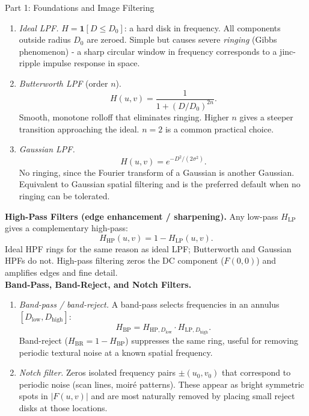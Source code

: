 \documentclass[letterpaper]{article}
\begin{document}
\begin{notes}{Part 1: Foundations and Image Filtering}
\begin{enumerate}
    \item \textit{Ideal LPF.} $H = \mathbf{1}[D \le D_0]$: a hard disk in frequency. All components outside radius $D_0$ are zeroed. Simple but causes severe \emph{ringing} (Gibbs phenomenon) - a sharp circular window in frequency corresponds to a jinc-ripple impulse response in space.

    \item \textit{Butterworth LPF} (order $n$).
    $$H(u,v) = \frac{1}{1+(D/D_0)^{2n}}.$$
    Smooth, monotone rolloff that eliminates ringing. Higher $n$ gives a steeper transition approaching the ideal. $n=2$ is a common practical choice.

    \item \textit{Gaussian LPF.}
    $$H(u,v) = e^{-D^2/(2\sigma^2)}.$$
    No ringing, since the Fourier transform of a Gaussian is another Gaussian. Equivalent to Gaussian spatial filtering and is the preferred default when no ringing can be tolerated.

 
\end{enumerate}

\textbf{High-Pass Filters (edge enhancement / sharpening).} Any low-pass $H_{\text{LP}}$ gives a complementary high-pass:
$$H_{\text{HP}}(u,v) = 1 - H_{\text{LP}}(u,v).$$
Ideal HPF rings for the same reason as ideal LPF; Butterworth and Gaussian HPFs do not. High-pass filtering zeros the DC component ($F(0,0)$) and amplifies edges and fine detail.\\

\textbf{Band-Pass, Band-Reject, and Notch Filters.}

\begin{enumerate}
    \item \textit{Band-pass / band-reject.} A band-pass selects frequencies in an annulus $[D_{\text{low}}, D_{\text{high}}]$:
    $$H_{\text{BP}} = H_{\text{HP},D_{\text{low}}} \cdot H_{\text{LP},D_{\text{high}}}.$$
    Band-reject ($H_{\text{BR}} = 1 - H_{\text{BP}}$) suppresses the same ring, useful for removing periodic textural noise at a known spatial frequency.
    
    \item \textit{Notch filter.} Zeros isolated frequency pairs $\pm(u_0, v_0)$ that correspond to periodic noise (scan lines, moiré patterns). These appear as bright symmetric spots in $|F(u,v)|$ and are most naturally removed by placing small reject disks at those locations.
\end{enumerate}




\end{notes}
\end{document}
